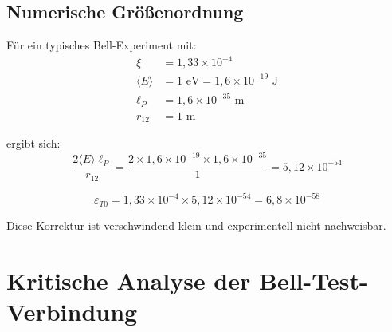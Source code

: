 \documentclass[12pt,a4paper]{article}
\begin{document}
\begin{technical}
		\subsection{Numerische Gr\"o\ss{}enordnung}
		
		F\"ur ein typisches Bell-Experiment mit:
		\begin{align}
			\xi &= 1{,}33 \times 10^{-4} \\
			\langle E \rangle &= 1 \text{ eV} = 1{,}6 \times 10^{-19} \text{ J} \\
			\ell_P &= 1{,}6 \times 10^{-35} \text{ m} \\
			r_{12} &= 1 \text{ m}
		\end{align}
		
		ergibt sich:
		\begin{equation}
			\frac{2\langle E \rangle \ell_P}{r_{12}} = \frac{2 \times 1{,}6 \times 10^{-19} \times 1{,}6 \times 10^{-35}}{1} = 5{,}12 \times 10^{-54}
		\end{equation}
		
		\begin{equation}
			\varepsilon_{T0} = 1{,}33 \times 10^{-4} \times 5{,}12 \times 10^{-54} = 6{,}8 \times 10^{-58}
		\end{equation}
		
		Diese Korrektur ist verschwindend klein und experimentell nicht nachweisbar.
	\end{technical}
	
	\section{Kritische Analyse der Bell-Test-Verbindung}
	
\end{document}

